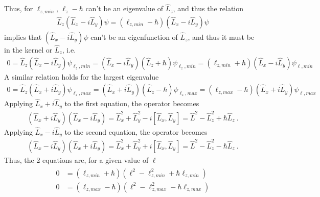 \documentclass[letterpaper,10pt,english]{jupyterBook}
\begin{document}
\sphinxAtStartPar
Thus, for \(\ell_{z,min}\), \(\ell_z - \hbar\) can’t be an eigenvalue of \(\hat{L}_z\), and thus the relation
\begin{equation*}
\begin{split}\hat{L}_z \left( \hat{L}_x - i \hat{L}_y \right) \psi = ( \ell_{z,min} - \hbar ) ( \hat{L}_x - i \hat{L}_y ) \psi\end{split}
\end{equation*}
\sphinxAtStartPar
implies that \(( \hat{L}_x - i \hat{L}_y ) \psi\) can’t be an eigenfunction of \(\hat{L}_z\), and thus it must be in the kernel or \(\hat{L}_z\), i.e.
\begin{equation*}
\begin{split}0 = \hat{L}_z ( \hat{L}_x - i \hat{L}_y ) \psi_{\ell_z,min} = ( \hat{L}_x - i \hat{L}_y ) ( \hat{L}_z + \hbar ) \psi_{\ell_z,min} = ( \ell_{z,min} + \hbar ) ( \hat{L}_x - i \hat{L}_y ) \psi_{\ell,min}\end{split}
\end{equation*}
\sphinxAtStartPar
A similar relation holds for the largest eigenvalue
\begin{equation*}
\begin{split}0 = \hat{L}_z ( \hat{L}_x + i \hat{L}_y ) \psi_{\ell_z,max} = ( \hat{L}_x + i \hat{L}_y ) ( \hat{L}_z - \hbar ) \psi_{\ell_z,max} = ( \ell_{z,max} - \hbar ) ( \hat{L}_x + i \hat{L}_y ) \psi_{\ell,max}\end{split}
\end{equation*}
\sphinxAtStartPar
Applying \(\hat{L}_x + i \hat{L}_y\) to the first equation, the operator becomes
\begin{equation*}
\begin{split}( \hat{L}_x + i \hat{L}_y ) ( \hat{L}_x - i \hat{L}_y ) = \hat{L}_x^2 + \hat{L}_y^2 - i [ \hat{L}_x, \hat{L}_y ]  = \hat{L}^2 - \hat{L}_z^2 + \hbar \hat{L}_z \ .\end{split}
\end{equation*}
\sphinxAtStartPar
Applying \(\hat{L}_x - i \hat{L}_y\) to the second equation, the operator becomes
\begin{equation*}
\begin{split}( \hat{L}_x - i \hat{L}_y ) ( \hat{L}_x + i \hat{L}_y ) = \hat{L}_x^2 + \hat{L}_y^2 + i [ \hat{L}_x, \hat{L}_y ]  = \hat{L}^2 - \hat{L}_z^2 - \hbar \hat{L}_z \ .\end{split}
\end{equation*}
\sphinxAtStartPar
Thus, the 2 equations are, for a given value of \(\ell\)
\begin{equation*}
\begin{split}\begin{aligned}
  0 & = ( \ell_{z,min} + \hbar ) ( \ell^2 - \ell_{z,min}^2 + \hbar \ell_{z,min} ) \\ 
  0 & = ( \ell_{z,max} - \hbar ) ( \ell^2 - \ell_{z,max}^2 - \hbar \ell_{z,max} ) \\ 
\end{aligned}\end{split}
\end{equation*}
\end{document}
